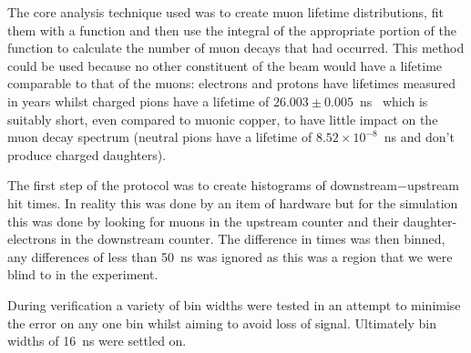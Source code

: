 The core analysis technique used was to create muon lifetime distributions, fit them with a function and then use the integral of the appropriate portion of the function to calculate the number of muon decays that had occurred. This method could be used because no other constituent of the beam would have a lifetime comparable to that of the muons: electrons and protons have lifetimes measured in years whilst charged pions have a lifetime of \(26.003\pm0.005\)~ns~\cite{PDG} which is suitably short, even compared to muonic copper, to have little impact on the muon decay spectrum (neutral pions have a lifetime of \( 8.52\times10^{-8}\)~ns and don't produce charged daughters).

The first step of the protocol was to create histograms of downstream\(-\)upstream hit times. In reality this was done by an item of hardware but for the simulation this was done by looking for muons in the upstream counter and their daughter-electrons in the downstream counter. The difference in times was then binned, any differences of less than 50~ns was ignored as this was a region that we were blind to in the experiment.

During verification a variety of bin widths were tested in an attempt to minimise the error on any one bin whilst aiming to avoid loss of signal. Ultimately bin widths of 16~ns were settled on. 

